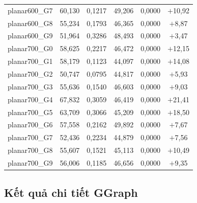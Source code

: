 \documentclass[12pt, a4paper]{article}
\begin{document}
\begin{longtable}{lccccc}
  planar600\_G7 & 60{,}130 & 0{,}1217 & 49{,}206 & 0{,}0000 & $+$10{,}92 \\
  planar600\_G8 & 55{,}234 & 0{,}1793 & 46{,}365 & 0{,}0000 & $+$8{,}87 \\
  planar600\_G9 & 51{,}964 & 0{,}3286 & 48{,}493 & 0{,}0000 & $+$3{,}47 \\
  \midrule
  planar700\_G0 & 58{,}625 & 0{,}2217 & 46{,}472 & 0{,}0000 & $+$12{,}15 \\
  planar700\_G1 & 58{,}179 & 0{,}1123 & 44{,}097 & 0{,}0000 & $+$14{,}08 \\
  planar700\_G2 & 50{,}747 & 0{,}0795 & 44{,}817 & 0{,}0000 & $+$5{,}93 \\
  planar700\_G3 & 55{,}636 & 0{,}1540 & 46{,}603 & 0{,}0000 & $+$9{,}03 \\
  planar700\_G4 & 67{,}832 & 0{,}3059 & 46{,}419 & 0{,}0000 & $+$21{,}41 \\
  planar700\_G5 & 63{,}709 & 0{,}3066 & 45{,}209 & 0{,}0000 & $+$18{,}50 \\
  planar700\_G6 & 57{,}558 & 0{,}2162 & 49{,}892 & 0{,}0000 & $+$7{,}67 \\
  planar700\_G7 & 52{,}436 & 0{,}2234 & 44{,}879 & 0{,}0000 & $+$7{,}56 \\
  planar700\_G8 & 55{,}607 & 0{,}1521 & 45{,}113 & 0{,}0000 & $+$10{,}49 \\
  planar700\_G9 & 56{,}006 & 0{,}1185 & 46{,}656 & 0{,}0000 & $+$9{,}35 \\
\end{longtable}

\subsection{Kết quả chi tiết GGraph}
\end{document}

